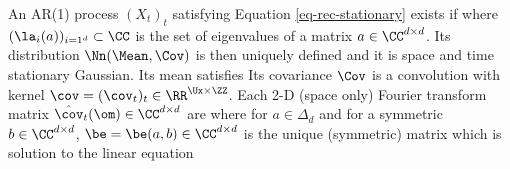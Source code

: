 \begin{proposition}\label{prop-ar-processes}
	An AR(1) process $(X_t)_t$ satisfying Equation \eqref{eq-rec-stationary} exists if  
	where $(\la_i(a))_{i=1^d} \subset \CC$ is the set of eigenvalues of a matrix $a \in \CC^{d \times d}$.
	Its distribution $\Nn(\Mean,\Cov)$ is then uniquely defined and it is space and time stationary Gaussian.
	Its mean satisfies 
	Its covariance $\Cov$ is a convolution with kernel 
$\cov = (\cov_t)_t \in \RR^{\Ux \times \ZZ}$. Each 2-D (space only) Fourier transform matrix $\hat \cov_t(\om) \in \CC^{d \times d}$ are
	where for $a \in \Delta_d$ and for a symmetric $b \in \CC^{d \times d}$, $\be = \be(a,b) \in \CC^{d \times d}$ is the unique (symmetric) matrix which is solution to the linear equation
\end{proposition}
